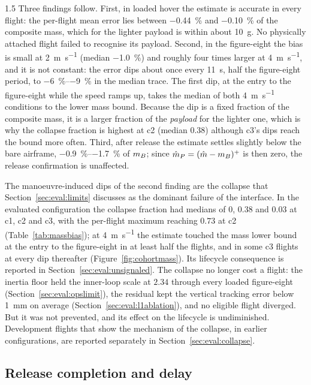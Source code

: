 \begin{spacing}{1.5}
Three findings follow. First, in loaded hover the estimate is accurate in every
flight: the per-flight mean error lies between \SI{-0.44}{\percent} and
\SI{-0.10}{\percent} of the composite mass, which for the lighter payload is
within about \SI{10}{\gram}. No physically attached flight failed to recognise
its payload. Second, in the figure-eight the bias is small at
\SI{2}{\meter\per\second} (median \SI{-1.0}{\percent}) and roughly four times
larger at \SI{4}{\meter\per\second}, and it is not constant: the error dips
about once every \SI{11}{\second}, half the figure-eight period, to
\SIrange{-6}{-9}{\percent} in the median trace. The first dip, at the entry to
the figure-eight while the speed ramps up, takes the median of both
\SI{4}{\meter\per\second} conditions to the lower mass bound. Because the dip is
a fixed fraction of the composite mass, it is a larger fraction of the
\emph{payload} for the lighter one, which is why the collapse fraction is
highest at c2 (median $0.38$) although c3's dips reach the bound more often.
Third, after release the estimate settles slightly below the bare airframe,
\SIrange{-0.9}{-1.7}{\percent} of $m_B$; since $\hat m_P=(\hat m-m_B)^+$ is then
zero, the release confirmation is unaffected.

The manoeuvre-induced dips of the second finding are the collapse that
Section~\ref{sec:eval:limits} discusses as the dominant failure of the
interface. In the evaluated configuration the collapse fraction had medians of
$0$, $0.38$ and $0.03$
at c1, c2 and c3, with the per-flight maximum reaching $0.73$ at c2
(Table~\ref{tab:massbias}); at \SI{4}{\meter\per\second} the estimate touched
the mass lower bound at the entry to the figure-eight in at least half the
flights, and in some c3 flights at every dip thereafter
(Figure~\ref{fig:cohortmass}). Its lifecycle consequence is reported in
Section~\ref{sec:eval:unsignaled}. The collapse no longer cost a flight: the inertia
floor held the inner-loop scale at $2.34$ through every loaded figure-eight
(Section~\ref{sec:eval:opslimit}), the residual kept the vertical tracking
error below \SI{1}{\milli\meter} on average (Section~\ref{sec:eval:l1ablation}),
and no eligible flight diverged. But it was not prevented, and its effect on the
lifecycle is undiminished. Development flights that show the mechanism of the collapse, in earlier
configurations, are reported separately in Section~\ref{sec:eval:collapse}.

\subsection{Release completion and delay}\label{sec:eval:completion}


\end{spacing}
